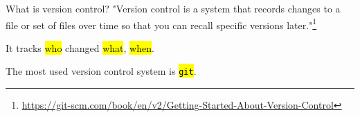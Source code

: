 \documentclass{beamer}
\begin{document}
\begin{frame}{What is version control?}\LARGE
  "Version control is a system that records changes to a file or set of files over time so that you can recall specific versions later."\footnote{\scriptsize\textcolor{black!50}{\url{https://git-scm.com/book/en/v2/Getting-Started-About-Version-Control}}}

  \vfill\larger
  It tracks \hl{who} changed \hl{what}, \hl{when}.

  \vfill\smaller
  The most used version control system is \hl{\texttt{git}}.
\end{frame}



\newcommand{\Commit}[4]{
  \node [commit, #1] (#2) {#3\\\textcolor{labss_bg!90!black}{\texttt{#4}}};
}
\end{document}
